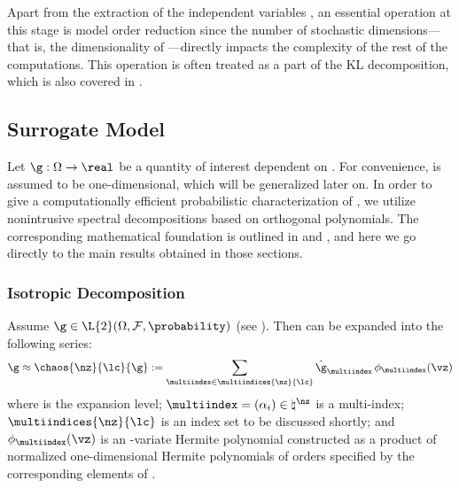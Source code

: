 Apart from the extraction of the independent variables \vz, an essential
operation at this stage is model order reduction since the number of stochastic
dimensions---that is, the dimensionality of \vz---directly impacts the
complexity of the rest of the computations. This operation is often treated as a
part of the \ac{KL} decomposition, which is also covered in
.

\subsection{Surrogate Model}

Let $\g: \Omega \to \real$ be a quantity of interest dependent on \vu. For
convenience, \g is assumed to be one-dimensional, which will be generalized
later on. In order to give a computationally efficient probabilistic
characterization of \g, we utilize nonintrusive spectral decompositions based on
orthogonal polynomials. The corresponding mathematical foundation is outlined in
 and , and here we go
directly to the main results obtained in those sections.

\subsubsection{Isotropic Decomposition}

Assume $\g \in \L{2}(\Omega, \mathcal{F}, \probability)$ (see
). Then \g can be expanded into the following series:
\[
  \g \approx \chaos{\nz}{\lc}{\g} := \sum_{\multiindex \in
  \multiindices{\nz}{\lc}} \hat{\g}_{\multiindex} \, \phi_{\multiindex}(\vz)
\]
where \lc is the expansion level; $\multiindex = (\alpha_i) \in \natural^\nz$ is
a multi-index; $\multiindices{\nz}{\lc}$ is an index set to be discussed
shortly; and $\phi_{\multiindex}(\vz)$ is an \nz-variate Hermite polynomial
constructed as a product of normalized one-dimensional Hermite polynomials of
orders specified by the corresponding elements of \multiindex.

